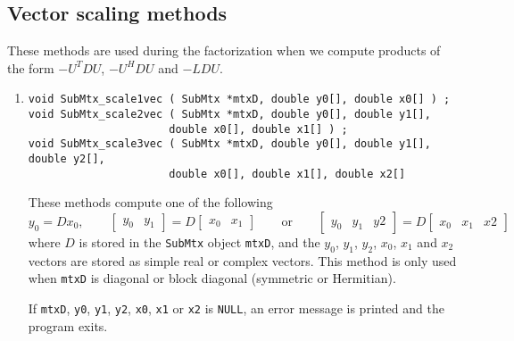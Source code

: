 \subsection{Vector scaling methods}
\label{subsection:SubMtx:proto:scale}
\par
These methods are used during the factorization when we compute
products of the form $-U^TDU$, $-U^HDU$ and $-LDU$.
\par
\begin{enumerate}
\item
\begin{verbatim}
void SubMtx_scale1vec ( SubMtx *mtxD, double y0[], double x0[] ) ;
void SubMtx_scale2vec ( SubMtx *mtxD, double y0[], double y1[], 
                      double x0[], double x1[] ) ;
void SubMtx_scale3vec ( SubMtx *mtxD, double y0[], double y1[], double y2[],
                      double x0[], double x1[], double x2[] 
\end{verbatim}
These methods compute one of the following
$$
y_0 = D x_0, 
\qquad
\left \lbrack \begin{array}{cc}
y_0 & y_1
\end{array} \right \rbrack
= D
\left \lbrack \begin{array}{cc}
x_0 & x_1
\end{array} \right \rbrack
\qquad
\mbox{or}
\qquad
\left \lbrack \begin{array}{ccc}
y_0 & y_1 & y2
\end{array} \right \rbrack
= D
\left \lbrack \begin{array}{ccc}
x_0 & x_1 & x2
\end{array} \right \rbrack
$$
where $D$ is stored in the {\tt SubMtx} object {\tt mtxD},
and the $y_0$, $y_1$, $y_2$, $x_0$, $x_1$ and $x_2$ vectors 
are stored as simple real or complex vectors.
This method is only used when {\tt mtxD} is diagonal or block
diagonal (symmetric or Hermitian).
\par {}
If {\tt mtxD}, {\tt y0}, {\tt y1}, {\tt y2}, {\tt x0}, {\tt x1}
or {\tt x2} is {\tt NULL},
an error message is printed and the program exits.
\end{enumerate}
\par
